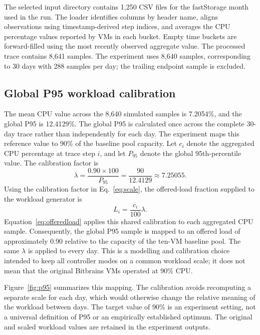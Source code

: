 \documentclass[pdflatex,sn-mathphys-num]{sn-jnl}
\begin{document}
The selected input directory contains 1,250 CSV files for the fastStorage month used in the run. The loader identifies columns by header name, aligns observations using timestamp-derived step indices, and averages the CPU percentage values reported by VMs in each bucket. Empty time buckets are forward-filled using the most recently observed aggregate value. The processed trace contains 8,641 samples. The experiment uses 8,640 samples, corresponding to 30 days with 288 samples per day; the trailing endpoint sample is excluded.

\subsection{Global P95 workload calibration}

The mean CPU value across the 8,640 simulated samples is 7.2054\%, and the global P95 is 12.4129\%. The global P95 is calculated once across the complete 30-day trace rather than independently for each day. The experiment maps this reference value to 90\% of the baseline pool capacity. Let $c_i$ denote the aggregated CPU percentage at trace step $i$, and let $P_{95}$ denote the global 95th-percentile value. The calibration factor is
\begin{equation}
\lambda=\frac{0.90\times100}{P_{95}}=\frac{90}{12.4129}\approx7.25055.
\label{eq:scale}
\end{equation}
Using the calibration factor in Eq.~\ref{eq:scale}, the offered-load fraction supplied to the workload generator is
\begin{equation}
L_i=\frac{c_i}{100}\lambda.
\label{eq:offeredload}
\end{equation}
Equation~\ref{eq:offeredload} applies this shared calibration to each aggregated CPU sample. Consequently, the global P95 sample is mapped to an offered load of approximately 0.90 relative to the capacity of the ten-VM baseline pool. The same $\lambda$ is applied to every day. This is a modelling and calibration choice intended to keep all controller modes on a common workload scale; it does not mean that the original Bitbrains VMs operated at 90\% CPU.

Figure~\ref{fig:p95} summarizes this mapping. The calibration avoids recomputing a separate scale for each day, which would otherwise change the relative meaning of the workload between days. The target value of 90\% is an experiment setting, not a universal definition of P95 or an empirically established optimum. The original and scaled workload values are retained in the experiment outputs.
\end{document}
